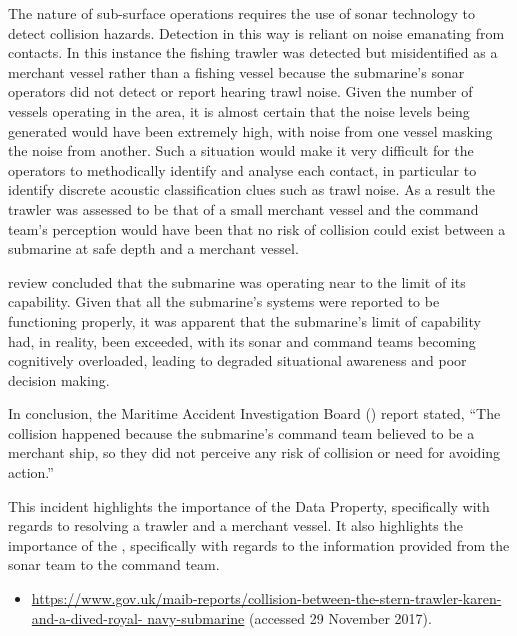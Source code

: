 The nature of sub-surface operations requires the use of sonar technology to detect collision hazards. Detection in this way is reliant on noise emanating from contacts. In this instance the fishing trawler was detected but misidentified as a merchant vessel rather than a fishing vessel because the submarine's sonar operators did not detect or report hearing trawl noise. Given the number of vessels operating in the area, it is almost certain that the noise levels being generated would have been extremely high, with noise from one vessel masking the noise from another. Such a situation would make it very difficult for the  operators to methodically identify and analyse each contact, in particular to identify discrete acoustic classification clues such as trawl noise. As a result the trawler was assessed to be that of a small merchant vessel and the command team's perception would have been that no risk of collision could exist between a submarine at safe depth and a merchant vessel. 

review concluded that the submarine was operating near to the limit of its capability. Given that all the submarine's systems were reported to be functioning properly, it was apparent that the submarine's limit of capability had, in reality, been exceeded, with its sonar and command teams becoming cognitively overloaded, leading to degraded situational awareness and poor decision making.

In conclusion, the Maritime Accident Investigation Board () report stated, ``The collision happened because the submarine's command team believed  to be a merchant ship, so they did not perceive any risk of collision or need for avoiding action.''

This incident highlights the importance of the  Data Property, specifically with regards to resolving a trawler and a merchant vessel. It also highlights the importance of the , specifically with regards to the information provided from the sonar team to the command team. 

\begin{samepage}
\begin{itemize}
  \item \raggedright{\href{https://www.gov.uk/maib-reports/collision-between-the-stern-trawler-karen-and-a-dived-royal-navy-submarine}{https://www.gov.uk/maib-reports/collision-between-the-stern-trawler-karen-and-a-dived-royal- navy-submarine} (accessed 29 November 2017).}
\end{itemize}
\end{samepage}


